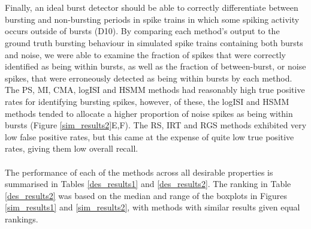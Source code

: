 \documentclass[12pt, titlepage]{article}
\begin{document}
\\ \\ Finally, an ideal burst detector should be able to correctly differentiate between bursting and non-bursting periods in spike trains in which some spiking activity occurs outside of bursts (D10). By comparing each method's output to the ground truth bursting behaviour in simulated spike trains containing both bursts and noise, we were able to examine the fraction of spikes that were correctly identified as being within bursts, as well as the fraction of between-burst, or noise spikes, that were erroneously detected as being within bursts by each method.
The PS, MI, CMA, logISI and HSMM methods had reasonably high true positive rates for identifying bursting spikes, however, of these, the logISI and HSMM methods tended to allocate a higher proportion of noise spikes as being within bursts (Figure \ref{sim_results2}E,F). The RS, IRT and RGS methods exhibited very low false positive rates, but this came at the expense of quite low true positive rates, giving them low overall recall.
 \\ \\ The performance of each of the methods across all desirable properties is summarised in Tables \ref{des_results1} and \ref{des_results2}. The ranking in Table \ref{des_results2} was based on the median and range of the boxplots in Figures \ref{sim_results1} and \ref{sim_results2}, with methods with similar results given equal rankings.
\end{document}
